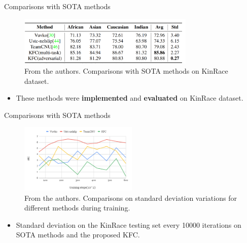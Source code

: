\documentclass[aspectratio=169,xcolor=dvipsnames]{beamer}
\begin{document}
\begin{frame}{Comparisons with SOTA methods}
    \begin{figure}
        \centering
        \includegraphics[width=0.75\textwidth]{imgs/7_Table4.png}
        \caption{From the authors. Comparisons with SOTA methods on KinRace dataset.}
        \label{fig:kfc-comparison-sota}
    \end{figure}
    \begin{itemize}
        \item These methods were \textbf{implemented} and \textbf{evaluated} on KinRace dataset.
    \end{itemize}
\end{frame}


\begin{frame}{Comparisons with SOTA methods}
\
    \begin{figure}
        \centering
        \includegraphics[width=0.5\textwidth]{imgs/8_Figure4.png}
        \caption{From the authors. Comparisons on standard deviation variations for different methods during training.}
        \label{fig:kfc-comparison-std}
    \end{figure}
    \begin{itemize}
        \item Standard deviation on the KinRace testing set every 10000 iterations on SOTA methods and the proposed KFC.
    \end{itemize}
\end{frame}

\end{document}
